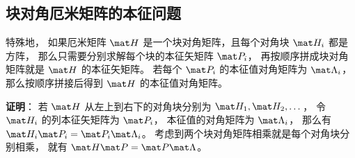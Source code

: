 \subsection{块对角厄米矩阵的本征问题}\label{sub_HerEig_2}
特殊地， 如果厄米矩阵 $\mat H$ 是一个块对角矩阵，且每个对角块 $\mat H_i$ 都是方阵， 那么只需要分别求解每个块的本征矢矩阵 $\mat P_i$， 再按顺序拼成块对角矩阵就是 $\mat H$ 的本征矢矩阵。 若每个 $\mat P_i$ 的本征值对角矩阵为 $\mat \Lambda_i$， 那么按顺序拼接后得到 $\mat H$ 的本征值对角矩阵。

\textbf{证明}： 若 $\mat H$ 从左上到右下的对角块分别为 $\mat H_1, \mat H_2, \dots$， 令 $\mat H_i$ 的列本征矢矩阵为 $\mat P_i$， 本征值的对角矩阵为 $\mat\Lambda_i$， 那么有 $\mat H_i \mat P_i = \mat P_i \mat \Lambda_i$。 考虑到两个块对角矩阵相乘就是每个对角块分别相乘， 就有 $\mat H \mat P = \mat P \mat \Lambda$。
